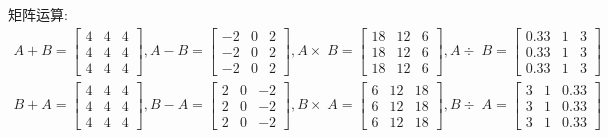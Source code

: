 \documentclass[UTF8,a4paper,notitlepage,openany,plain,final]{ctexbook}
\begin{document}
    矩阵运算:
    \[ \begin{split}
        A + B =
        \begin{bmatrix}
            4 & 4 & 4 \\
            4 & 4 & 4 \\
            4 & 4 & 4
        \end{bmatrix}
        , A - B =
        \begin{bmatrix}
            -2 & 0 & 2 \\
            -2 & 0 & 2 \\
            -2 & 0 & 2
        \end{bmatrix}
        , A \times\; B =
        \begin{bmatrix}
            18 & 12 & 6 \\
            18 & 12 & 6 \\
            18 & 12 & 6
        \end{bmatrix}
        , A \div\; B =
        \begin{bmatrix}
            0.33 & 1 & 3 \\
            0.33 & 1 & 3 \\
            0.33 & 1 & 3
        \end{bmatrix}
        \\
        B + A =
        \begin{bmatrix}
            4 & 4 & 4 \\
            4 & 4 & 4 \\
            4 & 4 & 4
        \end{bmatrix}
        , B - A =
        \begin{bmatrix}
            2 & 0 & -2 \\
            2 & 0 & -2 \\
            2 & 0 & -2
        \end{bmatrix}
        , B \times\; A =
        \begin{bmatrix}
            6 & 12 & 18 \\
            6 & 12 & 18 \\
            6 & 12 & 18
        \end{bmatrix}
        , B \div\; A =
        \begin{bmatrix}
            3 & 1 & 0.33 \\
            3 & 1 & 0.33 \\
            3 & 1 & 0.33
        \end{bmatrix}
    \end{split} \]
\end{document}
